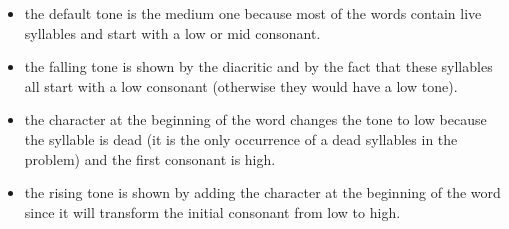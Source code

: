 \begin{refsection}
\begin{discussion}
\begin{itemize}
    \item the default tone is the medium one because most of the words contain live syllables and start with a low or mid consonant.
    \item the falling tone is shown by the diacritic  and by the fact that these syllables all start with a low consonant (otherwise they would have a low tone).
    \item the character  at the beginning of the word changes the tone to low because the syllable is dead (it is the only occurrence of a dead syllables in the problem) and the first consonant is high.
    \item the rising tone is shown by adding the character  at the beginning of the word since it will transform the initial consonant from low to high.
\end{itemize}
\end{discussion}


\nocite{Coulmas1999, Coulmas2003, Cruttenden2021, DanielsBright1996, Haarmann2004, Robinson1999}
\FurtherReadingBox{}
\end{refsection}


